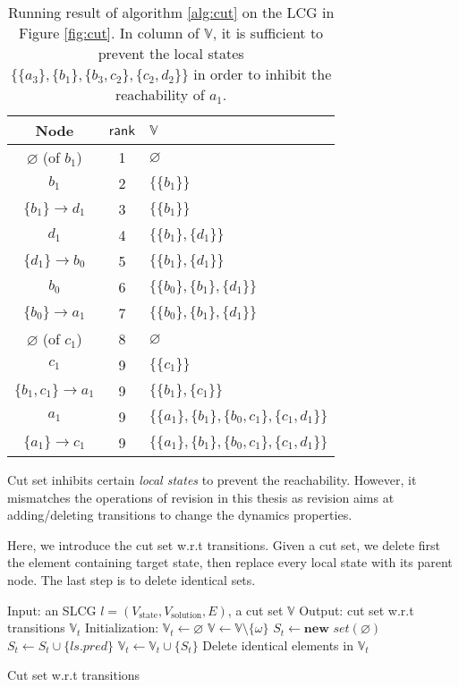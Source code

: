 \begin{table}[ht]
\centering
\begin{tabular}{|c|c|l|}
 \hline 
 Node & $\mathsf{rank}$ & $\mathbb{V}$ \\ 
 \hline 
 $\varnothing$ (of $b_1$) & 1 & $\varnothing$ \\ 
 \hline 
 $b_1$ & 2 & $\{\{b_1\}\}$ \\ 
 \hline 
 $\{b_1\}\to d_1$ & 3 & $\{\{b_1\}\}$ \\ 
 \hline 
 $d_1$ & 4 & $\{\{b_1\},\{d_1\}\}$ \\ 
 \hline 
 $\{d_1\}\to b_0$ & 5 & $\{\{b_1\},\{d_1\}\}$ \\ 
 \hline 
 $b_0$ & 6 & $\{\{b_0\},\{b_1\},\{d_1\}\}$ \\ 
 \hline 
 $\{b_0\}\to a_1$ & 7 & $\{\{b_0\},\{b_1\},\{d_1\}\}$ \\ 
 \hline 
 $\varnothing$ (of $c_1$) & 8 & $\varnothing$ \\ 
 \hline 
 $c_1$ & 9 & $\{\{c_1\}\}$ \\ 
 \hline 
 $\{b_1,c_1\}\to a_1$ & 9 & $\{\{b_1\},\{c_1\}\}$ \\ 
 \hline 
 $a_1$ & 9 & $\{\{a_1\},\{b_1\},\{b_0,c_1\},\{c_1,d_1\}\}$ \\ 
 \hline 
 $\{a_1\}\to c_1$ & 9 & $\{\{a_1\},\{b_1\},\{b_0,c_1\},\{c_1,d_1\}\}$ \\ 
 \hline 
 \end{tabular}
 \caption[Example of cut set]{Running result of algorithm \ref{alg:cut} on the LCG in Figure \ref{fig:cut}.
 In column of $\mathbb{V}$, it is sufficient to prevent the local states $\{\{a_3\},\{b_1\},\{b_3,c_2\},\{c_2,d_2\}\}$ in order to inhibit the reachability of $a_1$.}\label{tab:cutset}
\end{table}

Cut set inhibits certain \textit{local states} to prevent the reachability.
However, it mismatches the operations of revision in this thesis as revision aims at adding/deleting transitions to change the dynamics properties.

Here, we introduce the cut set w.r.t transitions.
Given a cut set, we delete first the element containing target state, then replace every local state with its parent node.
The last step is to delete identical sets.

\begin{algorithm}[ht]
\begin{algorithmic}
\State Input: an SLCG $l= (V_{\mathrm{state}},V_{\mathrm{solution}},E)$, a cut set $\mathbb{V}$
\State Output: cut set w.r.t transitions $\mathbb{V}_t$
\State Initialization: $\mathbb{V}_t\gets \varnothing$
        \State $\mathbb{V}\gets \mathbb{V}\setminus \{\omega\}$
    \EndIf
    \State $S_t\gets \textbf{new } set(\varnothing)$
        \State $S_t\gets S_t\cup \{ls.pred\}$
    \EndFor
    \State $\mathbb{V}_t\gets \mathbb{V}_t\cup \{S_t\}$
\EndFor
\State Delete identical elements in $\mathbb{V}_t$
\State {}
\end{algorithmic}
\caption{Cut set w.r.t transitions}\label{alg:cutsetTr}
\end{algorithm}

